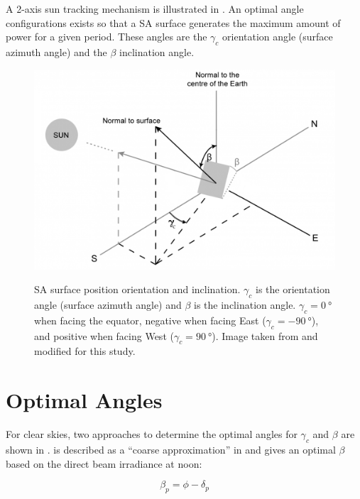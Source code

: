 A 2-axis sun tracking mechanism is illustrated in . An optimal angle configurations exists so that a \ac{SA} surface generates the maximum amount of power for a given period. These angles are the $\gamma_{c}$ orientation angle (surface azimuth angle) and the $\beta$ inclination angle.

\begin{figure}[h]
  \centering
  \hypersetup{linkcolor=captionTextColor}
  \includegraphics[width=0.7\linewidth]{sections/appendix/optimal-angles/images/beta-and-gamma-angles-on-tilted-surface.png}\\
  \caption[\ac{SA} surface position orientation and inclination]
          {\ac{SA} surface position orientation and inclination. $\gamma_{c}$ is the orientation angle (surface azimuth angle) and $\beta$ is the inclination angle. $\gamma_{c} = \SI{0}{\degree}$ when facing the equator, negative when facing East ($\gamma_{c} = \SI{-90}{\degree}$), and positive when facing West ($\gamma_{c} = \SI{+90}{\degree}$). Image taken from  and modified for this study.}
  \label{fig:tilted-surface-sun-tracking}
\end{figure}

\section{Optimal Angles}
For clear skies, two approaches to determine the optimal angles for $\gamma_{c}$ and $\beta$ are shown in .  is described as a ``coarse approximation'' in  and gives an optimal $\beta$ based on the direct beam irradiance at noon:

\begin{equation}
  \label{eq:optimal_beta_irradiance}
  \beta_{p} = \phi - \delta_{p}
\end{equation}

